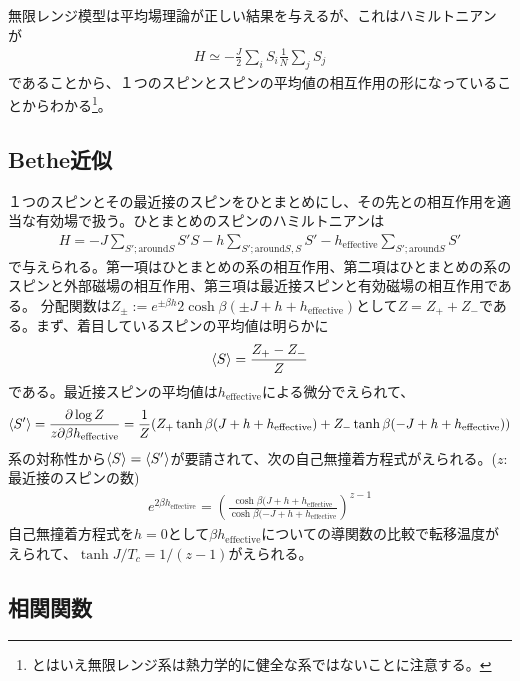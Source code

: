 \documentclass[autodetect-engine,dvipdfmx-if-dvi,ja=standard]{bxjsarticle}
\theoremstyle{break}
\begin{document}
            無限レンジ模型は平均場理論が正しい結果を与えるが、これはハミルトニアン が
            \begin{align}
                H\simeq -\frac{J}{2}\sum_{i}S_i \frac{1}{N}\sum_j  S_j
            \end{align}
            であることから、１つのスピンとスピンの平均値の相互作用の形になっていることからわかる\footnote{とはいえ無限レンジ系は熱力学的に健全な系ではないことに注意する。}。

        \subsection{Bethe近似}
            １つのスピンとその最近接のスピンをひとまとめにし、その先との相互作用を適当な有効場で扱う。ひとまとめのスピンのハミルトニアンは
            \begin{align}
                H=-J\sum_{S';\mathrm{around}S}S'S-h\sum_{S';\mathrm{around}S,S}S'-h_{\mathrm{effective}}\sum_{S';\mathrm{around}S}S'
            \end{align}
            で与えられる。第一項はひとまとめの系の相互作用、第二項はひとまとめの系のスピンと外部磁場の相互作用、第三項は最近接スピンと有効磁場の相互作用である。
            分配関数は$Z_\pm :=e^{\pm\beta h}2\cosh \beta(\pm J+h+h_{\mathrm{effective}})$として$Z=Z_+ +Z_-$である。まず、着目しているスピンの平均値は明らかに
            \begin{align}
                \braket{S}=\frac{Z_+ -Z_-}{Z}
            \end{align}
            である。最近接スピンの平均値は$h_{\mathrm{effective}}$による微分でえられて、
            \begin{align}
                \braket{S'}=\frac{\partial \log Z}{z\partial \beta h_{\mathrm{effective}}}=\frac{1}{Z}(Z_+\tanh \beta(J+h+h_{\mathrm{effective}})+Z_-\tanh \beta(-J+h+h_{\mathrm{effective}}))
            \end{align}
            系の対称性から$\braket{S}=\braket{S'}$が要請されて、次の自己無撞着方程式がえられる。($z$:最近接のスピンの数)
            \begin{align}
                e^{2\beta h_{\mathrm{effective}}}=\left(\frac{\cosh \beta(J+h+h_{\mathrm{effective}}}{\cosh \beta(-J+h+h_{\mathrm{effective}}}\right)^{z-1}
            \end{align}
            自己無撞着方程式を$h=0$として$\beta h_{\mathrm{effective}}$についての導関数の比較で転移温度がえられて、$\tanh J/T_c =1/(z-1)$がえられる。
        \subsection{相関関数}
\end{document}
